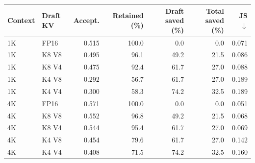 \begin{tabular}{llrrrrr}
\toprule
Context & Draft KV & Accept. & Retained (\%) & Draft saved (\%) & Total saved (\%) & JS $\downarrow$ \\
\midrule
1K & FP16 & 0.515 & 100.0 & 0.0 & 0.0 & 0.071 \\
1K & K8 V8 & 0.495 & 96.1 & 49.2 & 21.5 & 0.086 \\
1K & K8 V4 & 0.475 & 92.4 & 61.7 & 27.0 & 0.088 \\
1K & K4 V8 & 0.292 & 56.7 & 61.7 & 27.0 & 0.189 \\
1K & K4 V4 & 0.300 & 58.3 & 74.2 & 32.5 & 0.189 \\
\midrule
4K & FP16 & 0.571 & 100.0 & 0.0 & 0.0 & 0.051 \\
4K & K8 V8 & 0.552 & 96.8 & 49.2 & 21.5 & 0.068 \\
4K & K8 V4 & 0.544 & 95.4 & 61.7 & 27.0 & 0.069 \\
4K & K4 V8 & 0.454 & 79.6 & 61.7 & 27.0 & 0.142 \\
4K & K4 V4 & 0.408 & 71.5 & 74.2 & 32.5 & 0.160 \\
\bottomrule
\end{tabular}
